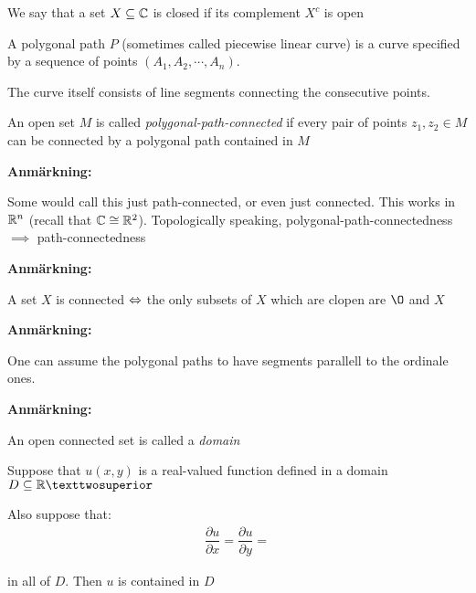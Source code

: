 \par\bigskip
\begin{theo}{}
  We say that a set $X\subseteq\mathbb{C}$ is closed if its complement $X^c$ is open
\end{theo}
\par\bigskip
\begin{theo}{}
  A polygonal path $P$ (sometimes called piecewise linear curve) is a curve specified by a sequence of points $(A_1,A_2,\cdots,A_n)$.\par
  \noindent The curve itself consists of line segments connecting the consecutive points. 
\end{theo}
\par\bigskip
\begin{theo}{}
  An open set $M$ is called \textit{polygonal-path-connected} if every pair of points $z_1,z_2\in M$ can be connected by a polygonal path contained in $M$ 
\end{theo}
\par\bigskip
\noindent\textbf{Anmärkning:}\par
\noindent Some would call this just path-connected, or even just connected. This works in $\mathbb{R}^n$ (recall that $\mathbb{C}\cong\mathbb{R}^2$). Topologically speaking, polygonal-path-connectedness $\implies$ path-connectedness
\par\bigskip
\noindent\textbf{Anmärkning:}\par
\noindent A set $X$ is connected $\Leftrightarrow$ the only subsets of $X$ which are clopen are $\O$ and $X$
\par\bigskip
\noindent\textbf{Anmärkning:}\par
\noindent One can assume the polygonal paths to have segments parallell to the ordinale ones.
\par\bigskip
\noindent\textbf{Anmärkning:}\par
\noindent An open connected set is called a \textit{domain}
\par\bigskip
\begin{theo}[]{}
  Suppose that $u(x,y)$ is a real-valued function defined in a domain $D\subseteq\R²$\par
  \noindent Also suppose that:
  \begin{equation*}
    \begin{gathered}
      \dfrac{\partial u}{\partial x} = \dfrac{\partial u}{\partial y} = 
    \end{gathered}
  \end{equation*}
  \par\bigskip
  \noindent in all of $D$. Then $u$ is contained in $D$
\end{theo}
